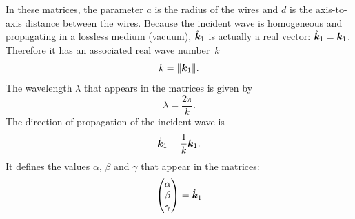 In these matrices, the parameter $a$ is the radius of the wires
and $d$ is the axis-to-axis distance between the wires.
Because the incident wave is homogeneous and propagating in a lossless medium (vacuum), $\hat{\bm{k}}_1$ is actually a real vector: $\hat{\bm{k}}_1 = \bm{k}_1$.
Therefore it has an associated real wave number~$k$
\begin{equation}
    k = \norm{\vect{k}_1}\text{.}
\end{equation}
The wavelength $\lambda$ that appears in the matrices is given by
\begin{equation}
    \lambda = \frac{2 \pi}{k}
    \text{.}
\end{equation}
The direction of propagation of the incident wave is
\begin{equation}
    \dot{\bm{k}}_1 = \frac{1}{k} \bm{k}_1
    \text{.}
\end{equation}
It defines the values $\alpha$, $\beta$ and $\gamma$ that appear in the matrices:
\begin{equation}
    \begin{pmatrix}
    \alpha \\ \beta \\ \gamma
    \end{pmatrix}
    =
    \dot{\bm{k}}_1
\end{equation}

